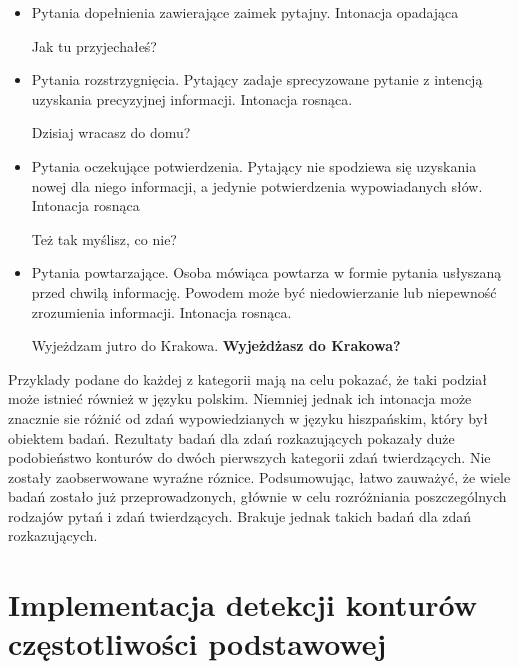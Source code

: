 \documentclass[a4paper,12 pt]{report}
\begin{document}
\begin{itemize}
\item{Pytania dopełnienia zawierające zaimek pytajny. Intonacja opadająca}
\begin{exe}
\ex Jak tu przyjechałeś?
\end{exe}
\item{Pytania rozstrzygnięcia. Pytający zadaje sprecyzowane pytanie z intencją uzyskania precyzyjnej informacji. Intonacja rosnąca.}
\begin{exe}
\ex Dzisiaj wracasz do domu?
\end{exe}
\item{Pytania oczekujące potwierdzenia. Pytający nie spodziewa się uzyskania nowej dla niego informacji, a jedynie potwierdzenia wypowiadanych słów. Intonacja rosnąca}
\begin{exe}
\ex Też tak myślisz, co nie?
\end{exe}
\item{Pytania powtarzające. Osoba mówiąca powtarza w formie pytania usłyszaną przed chwilą informację. Powodem może być niedowierzanie lub niepewność zrozumienia informacji. Intonacja rosnąca.}
\begin{exe}
\ex Wyjeżdzam jutro do Krakowa.
\newline
\textbf{Wyjeżdżasz do Krakowa?}
\end{exe}
\end{itemize}
Przyklady podane do każdej z kategorii mają na celu pokazać, że taki podział może istnieć również w języku polskim. Niemniej jednak ich intonacja może znacznie sie różnić od zdań wypowiedzianych w języku hiszpańskim, który był obiektem badań. Rezultaty badań dla zdań rozkazujących pokazały duże podobieństwo konturów do dwóch pierwszych kategorii zdań twierdzących. Nie zostały zaobserwowane wyraźne róznice.
\newline
Podsumowując, łatwo zauważyć, że wiele badań zostało już przeprowadzonych, głównie w celu rozróżniania poszczególnych rodzajów pytań i zdań twierdzących. Brakuje jednak takich badań dla zdań rozkazujących.
\newpage
\chapter{Implementacja detekcji konturów częstotliwości podstawowej}
\end{document}
